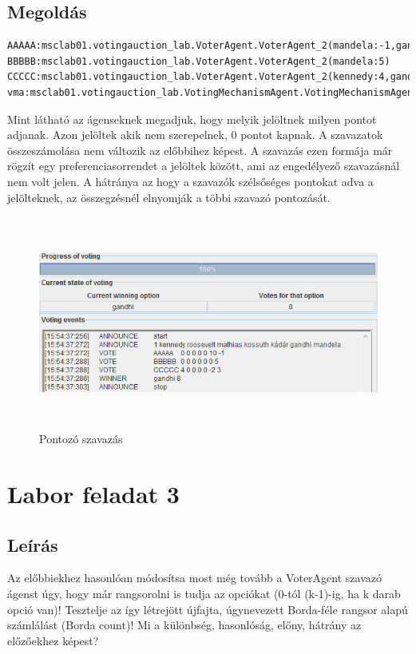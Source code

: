 \subsection{Megoldás}
\begin{lstlisting}[caption=Pontozó run-config, frame=single,float=!ht]
AAAAA:msclab01.votingauction_lab.VoterAgent.VoterAgent_2(mandela:-1,gandhi:10)
BBBBB:msclab01.votingauction_lab.VoterAgent.VoterAgent_2(mandela:5)
CCCCC:msclab01.votingauction_lab.VoterAgent.VoterAgent_2(kennedy:4,gandhi:-2,mandela:3)
vma:msclab01.votingauction_lab.VotingMechanismAgent.VotingMechanismAgent(voting01.cfg)
\end{lstlisting}
Mint látható az ágenseknek megadjuk, hogy melyik jelöltnek milyen pontot adjanak. Azon jelöltek akik nem szerepelnek, 0 pontot kapnak. A szavazatok összeszámolása nem változik az előbbihez képest. A szavazás ezen formája már rögzít egy preferenciasorrendet a jelöltek között, ami az engedélyező szavazásnál nem volt jelen. A hátránya az hogy a szavazók szélsőséges pontokat adva a jelölteknek, az összegzésnél elnyomják a többi szavazó pontozását.
\begin{figure}[!h]
\begin{center}
\includegraphics[height=7cm]{figures/fel2.png}
\caption{Pontozó szavazás}
\end{center}
\end{figure}

\section{Labor feladat 3}
\subsection{Leírás}
Az előbbiekhez hasonlóan módosítsa most még tovább a VoterAgent szavazó ágenst úgy,
hogy már rangsorolni is tudja az opciókat (0-tól (k-1)-ig, ha k darab opció van)! Tesztelje az
így létrejött újfajta, úgynevezett Borda-féle rangsor alapú számlálást (Borda count)! Mi a
különbség, hasonlóság, előny, hátrány az előzőekhez képest?
